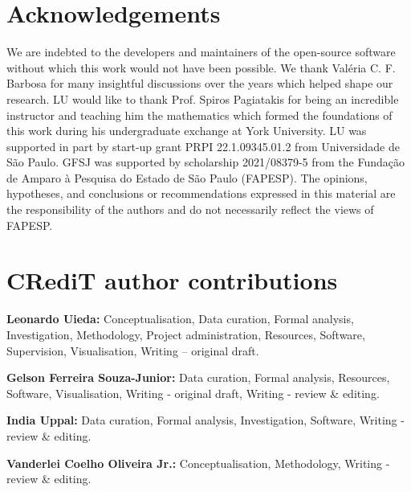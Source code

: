 \section*{Acknowledgements}


We are indebted to the developers and maintainers of the open-source software
without which this work would not have been possible.
We thank Valéria C. F. Barbosa for many insightful discussions over the years
which helped shape our research.
LU would like to thank Prof. Spiros Pagiatakis for being an incredible
instructor and teaching him the mathematics which formed the foundations of
this work during his undergraduate exchange at York University.
LU was supported in part by start-up grant PRPI 22.1.09345.01.2 from
Universidade de São Paulo.
GFSJ was supported by scholarship 2021/08379-5 from the Fundação de Amparo
à Pesquisa do Estado de São Paulo (FAPESP).
The opinions, hypotheses, and conclusions or recommendations expressed in this
material are the responsibility of the authors and do not necessarily reflect
the views of FAPESP.

\section*{CRediT author contributions}

\textbf{Leonardo Uieda:} Conceptualisation, Data curation, Formal analysis,
Investigation, Methodology, Pro\-ject administration, Resources, Software,
Supervision, Visualisation, Writing – original draft.

\noindent
\textbf{Gelson Ferreira Souza-Junior:} Data curation, Formal analysis,
Resources, Software, Visualisation, Writing - original draft, Writing - review
\& editing.

\noindent
\textbf{India Uppal:} Data curation, Formal analysis, Investigation, Software,
Writing - review \& editing.

\noindent
\textbf{Vanderlei Coelho Oliveira Jr.:} Conceptualisation, Methodology, Writing
- review \& editing.
